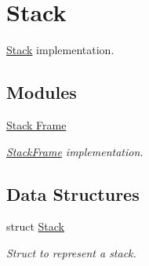 \hypertarget{group__Stack}{}\section{Stack}
\label{group__Stack}


\hyperlink{structStack}{Stack} implementation.  


\subsection*{Modules}
\begin{DoxyCompactItemize}
\item 
\hyperlink{group__StackFrame}{Stack Frame}
\begin{DoxyCompactList}\small\item\em \hyperlink{structStackFrame}{Stack\+Frame} implementation. \end{DoxyCompactList}\end{DoxyCompactItemize}
\subsection*{Data Structures}
\begin{DoxyCompactItemize}
\item 
struct \hyperlink{structStack}{Stack}
\begin{DoxyCompactList}\small\item\em Struct to represent a stack. \end{DoxyCompactList}\end{DoxyCompactItemize}
